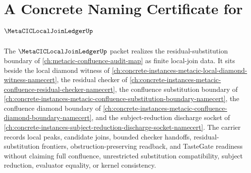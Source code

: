 \chapter{A Concrete Naming Certificate for $\MetaCICLocalJoinLedgerUp$}
\label{ch:concrete-instances-metacic-local-join-ledger-namecert}

The $\MetaCICLocalJoinLedgerUp$ packet realizes the residual-substitution boundary of \autoref{ch:metacic-confluence-audit-map} as finite local-join data. It sits beside the local diamond witness of \autoref{ch:concrete-instances-metacic-local-diamond-witness-namecert}, the residual checker of \autoref{ch:concrete-instances-metacic-confluence-residual-checker-namecert}, the confluence substitution boundary of \autoref{ch:concrete-instances-metacic-confluence-substitution-boundary-namecert}, the confluence diamond boundary of \autoref{ch:concrete-instances-metacic-confluence-diamond-boundary-namecert}, and the subject-reduction discharge socket of \autoref{ch:concrete-instances-subject-reduction-discharge-socket-namecert}. The carrier records local peaks, candidate joins, bounded checker handoffs, residual-substitution frontiers, obstruction-preserving readback, and TasteGate readiness without claiming full confluence, unrestricted substitution compatibility, subject reduction, evaluator equality, or kernel consistency.

